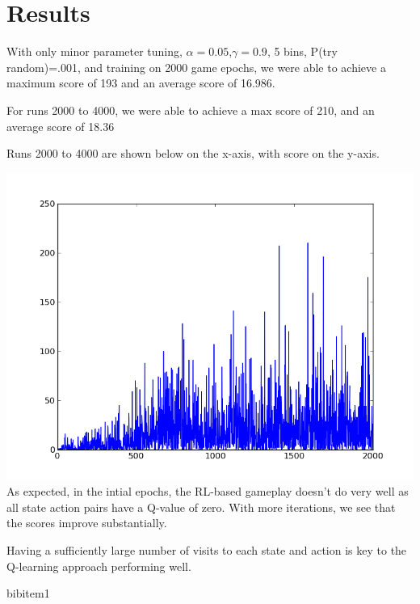 \documentclass[11pt, oneside]{article}   	%
\begin{document}
\section*{Results}
With only minor parameter tuning, $\alpha = 0.05$,$\gamma = 0.9$, 5 bins, P(try random)=.001, and training on 2000 game epochs, we were able to achieve a maximum score of 193 and an average score of 16.986.

For runs 2000 to 4000, we were able to achieve a max score of 210, and an average score of 18.36

Runs 2000 to 4000 are shown below on the x-axis, with score on the y-axis.

\includegraphics[scale=.5]{graph2}
\newline
As expected, in the intial epochs, the RL-based gameplay doesn't do very well as all state action pairs have a Q-value of zero. With more iterations, we see that the scores improve substantially.

Having a sufficiently large number of visits to each state and action is key to the Q-learning approach performing well.

\begin{thebibliography}{1}

 bibitem1 
 
  \end{thebibliography}
\end{document}
